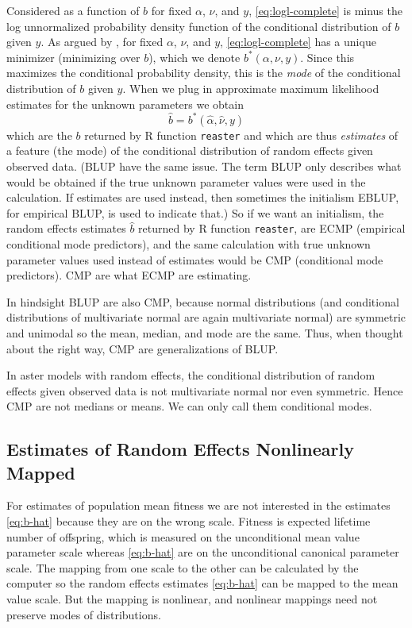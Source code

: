 \documentclass[11pt]{article}
\let\code=\texttt
\begin{document}
Considered as a function of $b$ for fixed $\alpha$, $\nu$, and $y$,
\eqref{eq:logl-complete} is minus the log unnormalized probability density
function of the
conditional distribution of $b$ given $y$.  As argued
by \citet[Section~2]{reaster},
for fixed $\alpha$, $\nu$, and $y$, \eqref{eq:logl-complete} has a unique
minimizer (minimizing over $b$), which we denote $b^*(\alpha, \nu, y)$.
Since this maximizes the conditional probability density, this is the
\emph{mode} of the conditional distribution of $b$ given $y$.
When we plug in approximate maximum likelihood estimates for the unknown
parameters we obtain
\begin{equation} \label{eq:b-hat}
   \hat{b} = b^*(\hat{\alpha}, \hat{\nu}, y)
\end{equation}
which are the $b$ returned by R function \code{reaster} and which are thus
\emph{estimates} of a feature (the mode) of the conditional distribution
of random effects given
observed data.  (BLUP have the same issue.  The term BLUP only describes
what would be obtained if the true unknown parameter values were used in
the calculation.  If estimates are used instead, then sometimes the
initialism EBLUP, for empirical BLUP, is used to indicate that.)
So if we want an initialism, the random effects estimates $\hat{b}$ returned
by R function \code{reaster}, are ECMP (empirical conditional mode predictors),
and the same calculation with true unknown parameter values used instead
of estimates would be CMP (conditional mode predictors).
CMP are what ECMP are estimating.

In hindsight BLUP are also CMP, because normal distributions (and
conditional distributions of multivariate normal are again multivariate normal)
are symmetric and unimodal so the mean, median, and mode are the same.
Thus, when thought about the right way, CMP are generalizations of BLUP.

In aster models with random effects, the conditional distribution of random
effects given observed data is not multivariate normal nor even symmetric.
Hence CMP are not medians or means.  We can only call them conditional modes.

\subsection{Estimates of Random Effects Nonlinearly Mapped}

For estimates of population mean fitness we are not interested in the
estimates \eqref{eq:b-hat} because they are on the wrong scale.  Fitness
is expected lifetime number of offspring, which is measured on the
unconditional mean value parameter scale whereas \eqref{eq:b-hat} are
on the unconditional canonical parameter scale.  The mapping from one
scale to the other can be calculated by the computer so the random effects
estimates \eqref{eq:b-hat} can be mapped to the mean value scale.
But the mapping is nonlinear, and nonlinear mappings need not preserve
modes of distributions.
\end{document}
